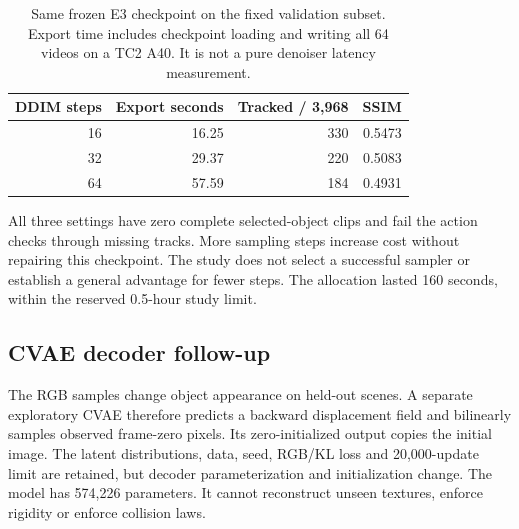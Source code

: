 \documentclass[11pt,a4paper]{article}
\begin{document}
\begin{table}[!ht]
\centering
\begin{tabular}{rrrr}
\hline
DDIM steps & Export seconds & Tracked / 3,968 & SSIM \\
\hline
16 & 16.25 & 330 & 0.5473 \\
32 & 29.37 & 220 & 0.5083 \\
64 & 57.59 & 184 & 0.4931 \\
\hline
\end{tabular}
\caption{Same frozen E3 checkpoint on the fixed validation subset. Export time includes checkpoint loading and writing all 64 videos on a TC2 A40. It is not a pure denoiser latency measurement.}
\label{tab:steps}
\end{table}

All three settings have zero complete selected-object clips and fail the action checks through missing tracks. More sampling steps increase cost without repairing this checkpoint. The study does not select a successful sampler or establish a general advantage for fewer steps. The allocation lasted 160 seconds, within the reserved 0.5-hour study limit.

\subsection{CVAE decoder follow-up}
The RGB samples change object appearance on held-out scenes. A separate exploratory CVAE therefore predicts a backward displacement field and bilinearly samples observed frame-zero pixels. Its zero-initialized output copies the initial image. The latent distributions, data, seed, RGB/KL loss and 20,000-update limit are retained, but decoder parameterization and initialization change. The model has 574,226 parameters. It cannot reconstruct unseen textures, enforce rigidity or enforce collision laws.
\end{document}
